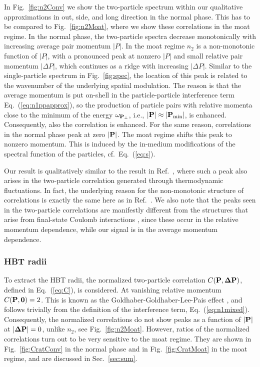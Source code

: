 \documentclass[reprint,superscriptaddress,english,preprintnumbers,amsmath,amssymb,aps,prx]{revtex4-2}
\def\Eq#1{Eq.~(\ref{#1})}
\def\Fig#1{Fig.~\ref{#1}}
\def\Sec#1{Sec.~\ref{#1}}
\begin{document}
In \Fig{fig:n2Conv} we show the two-particle spectrum within our qualitative approximations in out, side, and long direction in the normal phase. This has to be compared to \Fig{fig:n2Moat}, where we show these correlations in the moat regime. In the normal phase, the two-particle spectra decrease monotonically with increasing average pair momentum $|P|$. In the moat regime $n_2$ is a non-monotonic function of $|P|$, with a pronounced peak at nonzero $|P|$ and small relative pair momentum $|\Delta P|$, which continues as a ridge with increasing $|\Delta P|$.
Similar to the single-particle spectrum in \Fig{fig:spec}, the location of this peak is related to the wavenumber of the underlying spatial modulation. The reason is that the average momentum is put on-shell in the particle-particle  interference term \Eq{eq:n1ppapprox}, so the production of particle pairs with relative momenta close to the minimum of the energy $\omega_{\bold{P}_\perp}$, i.e., $|\bold{P}| \approx |\bold{P}_{\rm min}|$, is enhanced. Consequently, also the correlation is enhanced. For the same reason, correlations in the normal phase peak at zero $|\bold{P}|$. The moat regime shifts this peak to nonzero momentum. This is induced by the in-medium modifications of the spectral function of the particles, cf.\ \Eq{eq:s}.

Our result is qualitatively similar to the result in Ref.\ \cite{Pisarski:2021qof}, where such a peak also arises in the two-particle correlation generated through thermodynamic fluctuations. In fact, the underlying reason for the non-monotonic structure of correlations is exactly the same here as in Ref.\ \cite{Pisarski:2021qof}. We also note that the peaks seen in the two-particle correlations are manifestly different from the structures that arise from final-state Coulomb interactions \cite{Sinyukov:1998fc}, since these occur in the relative momentum dependence, while our signal is in the average momentum dependence.




\subsubsection{HBT radii}

To extract the HBT radii, the normalized two-particle correlation $C(\bold{P},\bold{\Delta P})$, defined in \Eq{eq:C}, is considered. At vanishing relative momentum $C(\bold{P},\bold{0}) = 2$. 
This is known as the Goldhaber-Goldhaber-Lee-Pais effect \cite{Goldhaber:1960sf}, and follows trivially from the definition of the interference term, \Eq{eq:n1mixed}. Consequently, the normalized correlations do not show peaks as a function of $|\bold{P}|$ at $|\bold{\Delta P}| = 0$, unlike $n_2$, see \Fig{fig:n2Moat}.
However, ratios of the normalized correlations turn out to be very sensitive to the moat regime. They are shown in \Fig{fig:CratConv} in the normal phase and in \Fig{fig:CratMoat} in the moat regime, and are discussed in \Sec{sec:sum}. 
\end{document}
